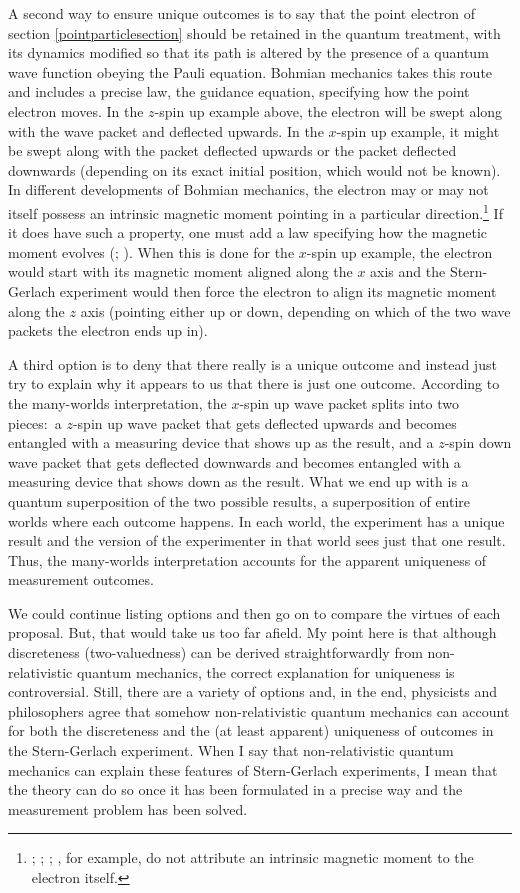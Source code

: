 \documentclass[onecolumn,secnumarabic,amsmath,amssymb,balancelastpage,nofootinbib]{article}
\begin{document}
A second way to ensure unique outcomes is to say that the point electron of section \ref{pointparticlesection} should be retained in the quantum treatment, with its dynamics modified so that its path is altered by the presence of a quantum wave function obeying the Pauli equation.  Bohmian mechanics takes this route and includes a precise law, the guidance equation, specifying how the point electron moves.  In the $z$-spin up example above, the electron will be swept along with the wave packet and deflected upwards. In the $x$-spin up example, it might be swept along with the packet deflected upwards or the packet deflected downwards (depending on its exact initial position, which would not be known).  In different developments of Bohmian mechanics, the electron may or may not itself possess an intrinsic magnetic moment pointing in a particular direction.\footnote{\citet[ch.\ 7]{albertQM}; \citet[ch.\ 10]{bohmhiley}; \citet[sec.\ 8.4]{durrtteufel}; \citet[pg.\ 346]{norsen2014}, for example, do not attribute an intrinsic magnetic moment to the electron itself.}  If it does have such a property, one must add a law specifying how the magnetic moment evolves (\citealp{dewdney1986}; \citealp[ch.\ 9]{holland}).  When this is done for the $x$-spin up example, the electron would start with its magnetic moment aligned along the $x$ axis and the Stern-Gerlach experiment would then force the electron to align its magnetic moment along the $z$ axis (pointing either up or down, depending on which of the two wave packets the electron ends up in).

A third option is to deny that there really is a unique outcome and instead just try to explain why it appears to us that there is just one outcome.  According to the many-worlds interpretation, the $x$-spin up wave packet splits into two pieces:\ a $z$-spin up wave packet that gets deflected upwards and becomes entangled with a measuring device that shows up as the result, and a $z$-spin down wave packet that gets deflected downwards and becomes entangled with a measuring device that shows down as the result.  What we end up with is a quantum superposition of the two possible results, a superposition of entire worlds where each outcome happens.  In each world, the experiment has a unique result and the version of the experimenter in that world sees just that one result.  Thus, the many-worlds interpretation accounts for the apparent uniqueness of measurement outcomes.

We could continue listing options and then go on to compare the virtues of each proposal.  But, that would take us too far afield.  My point here is that although discreteness (two-valuedness) can be derived straightforwardly from non-relativistic quantum mechanics, the correct explanation for uniqueness is controversial.  Still, there are a variety of options and, in the end, physicists and philosophers agree that somehow non-relativistic quantum mechanics can account for both the discreteness and the (at least apparent) uniqueness of outcomes in the Stern-Gerlach experiment.  When I say that non-relativistic quantum mechanics can explain these features of Stern-Gerlach experiments, I mean that the theory can do so once it has been formulated in a precise way and the measurement problem has been solved.
\end{document}

